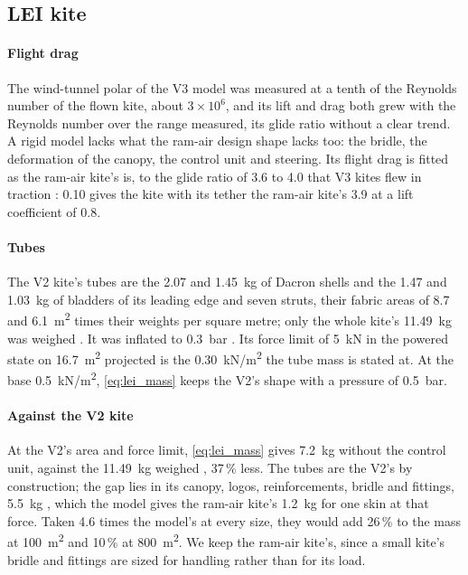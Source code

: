 \subsection{LEI kite}
\label{sec:det_lei}

\paragraph{Flight drag} The wind-tunnel polar of the V3 model \citep{poland2025} was measured at a tenth of the Reynolds number of the flown kite, about $3\times10^6$, and its lift and drag both grew with the Reynolds number over the range measured, its glide ratio without a clear trend. A rigid model lacks what the ram-air design shape lacks too: the bridle, the deformation of the canopy, the control unit and steering. Its flight drag is fitted as the ram-air kite's is, to the glide ratio of 3.6 to 4.0 that V3 kites flew in traction \citep{vandervlugt2019}: 0.10 gives the kite with its tether the ram-air kite's 3.9 at a lift coefficient of 0.8.

\paragraph{Tubes} The V2 kite's tubes are the 2.07 and 1.45~kg of Dacron shells and the 1.47 and 1.03~kg of bladders of its leading edge and seven struts, their fabric areas of 8.7 and \SI{6.1}{m^2} times their weights per square metre; only the whole kite's 11.49~kg was weighed \citep[Table~2-1]{schwoll2012}. It was inflated to 0.3~bar \citep{schwoll2012}. Its force limit of \SI{5}{kN} in the powered state \citep{vandervlugt2013} on \SI{16.7}{m^2} projected is the \SI{0.30}{kN/m^2} the tube mass is stated at. At the base \SI{0.5}{kN/m^2}, \cref{eq:lei_mass} keeps the V2's shape with a pressure of 0.5~bar.

\paragraph{Against the V2 kite} At the V2's area and force limit, \cref{eq:lei_mass} gives 7.2~kg without the control unit, against the 11.49~kg weighed \citep{schwoll2012}, 37\,\% less. The tubes are the V2's by construction; the gap lies in its canopy, logos, reinforcements, bridle and fittings, 5.5~kg \citep{schwoll2012}, which the model gives the ram-air kite's 1.2~kg for one skin at that force. Taken 4.6 times the model's at every size, they would add 26\,\% to the mass at \SI{100}{m^2} and 10\,\% at \SI{800}{m^2}. We keep the ram-air kite's, since a small kite's bridle and fittings are sized for handling rather than for its load.

